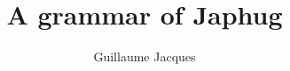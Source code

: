 \title{A grammar of Japhug}  %
\subtitle{}
\dedication{}
\author{Guillaume Jacques}
\renewcommand{\lsISBNdigital}{000-0-000000-00-0}
\renewcommand{\lsISBNhardcover}{000-0-000000-00-0}
\renewcommand{\lsISBNsoftcover}{000-0-000000-00-0}
\renewcommand{\lsISBNsoftcoverus}{000-0-000000-00-0}
\renewcommand{\lsSeries}{sidl} %
\renewcommand{\lsSeriesNumber}{99} %

 
 
 
 
  
